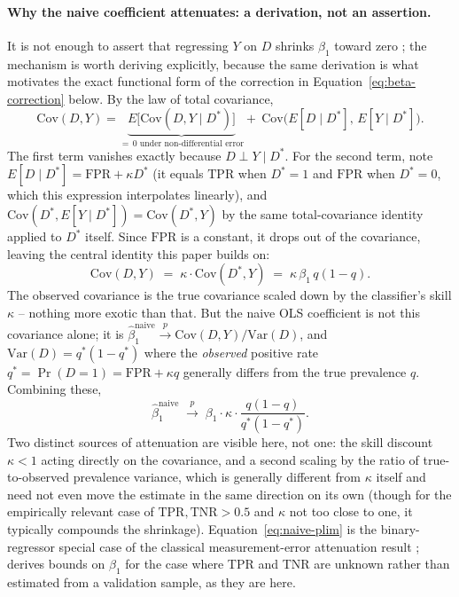 \documentclass[12pt]{article}
\begin{document}
\paragraph{Why the naive coefficient attenuates: a derivation, not an assertion.} It is not enough to assert that regressing $Y$ on $D$ shrinks $\beta_1$ toward zero \citep{aigner1973regression}; the mechanism is worth deriving explicitly, because the same derivation is what motivates the exact functional form of the correction in Equation~\ref{eq:beta-correction} below. By the law of total covariance,
\[
\mathrm{Cov}(D,Y) = \underbrace{E\big[\mathrm{Cov}(D,Y\mid D^{*})\big]}_{=\,0 \text{ under non-differential error}} + \ \mathrm{Cov}\big(E[D\mid D^{*}],\, E[Y\mid D^{*}]\big).
\]
The first term vanishes exactly because $D \perp Y \mid D^{*}$. For the second term, note $E[D\mid D^{*}] = \text{FPR} + \kappa D^{*}$ (it equals $\text{TPR}$ when $D^{*}=1$ and $\text{FPR}$ when $D^{*}=0$, which this expression interpolates linearly), and $\mathrm{Cov}(D^{*}, E[Y\mid D^{*}]) = \mathrm{Cov}(D^{*},Y)$ by the same total-covariance identity applied to $D^{*}$ itself. Since $\text{FPR}$ is a constant, it drops out of the covariance, leaving the central identity this paper builds on:
\begin{equation}
\mathrm{Cov}(D,Y) \;=\; \kappa \cdot \mathrm{Cov}(D^{*},Y) \;=\; \kappa\,\beta_1\,q(1-q).
\label{eq:attenuation-identity}
\end{equation}
The observed covariance is the true covariance scaled down by the classifier's skill $\kappa$ -- nothing more exotic than that. But the naive OLS coefficient is not this covariance alone; it is $\hat\beta_1^{\text{naive}} \overset{p}{\to} \mathrm{Cov}(D,Y)/\mathrm{Var}(D)$, and $\mathrm{Var}(D) = q^{*}(1-q^{*})$ where the \emph{observed} positive rate $q^{*} = \Pr(D=1) = \text{FPR} + \kappa q$ generally differs from the true prevalence $q$. Combining these,
\begin{equation}
\hat\beta_1^{\text{naive}} \;\overset{p}{\to}\; \beta_1 \cdot \kappa \cdot \frac{q(1-q)}{q^{*}(1-q^{*})}.
\label{eq:naive-plim}
\end{equation}
Two distinct sources of attenuation are visible here, not one: the skill discount $\kappa<1$ acting directly on the covariance, and a second scaling by the ratio of true-to-observed prevalence variance, which is generally different from $\kappa$ itself and need not even move the estimate in the same direction on its own (though for the empirically relevant case of $\text{TPR},\text{TNR} > 0.5$ and $\kappa$ not too close to one, it typically compounds the shrinkage). Equation~\ref{eq:naive-plim} is the binary-regressor special case of the classical measurement-error attenuation result \citep{aigner1973regression}; \citet{bollinger1996bounding} derives bounds on $\beta_1$ for the case where TPR and TNR are unknown rather than estimated from a validation sample, as they are here.
\end{document}
